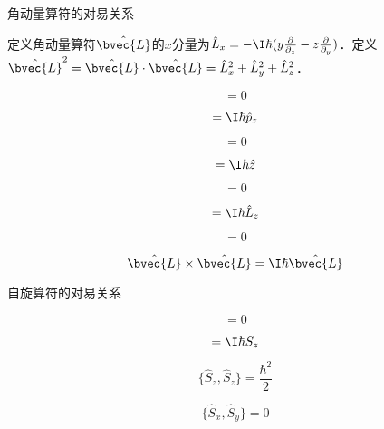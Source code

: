 \begin{theorem}{角动量算符的对易关系}\label{QMPrcp_the6}

定义角动量算符$\hat{\bvec{L}}$的$x$分量为$\hat{L}_x=-\I\hbar(y\frac{\partial}{\partial_z}-z\frac{\partial}{\partial _y})$．定义$\hat{\bvec{L}}^2=\hat{\bvec{L}}\cdot \hat{\bvec{L}}=\hat{L}_x^2+\hat{L}_y^2+\hat{L}_z^2$．

\begin{equation}
[\hat{p}_x, \hat{L}_x]=0
\end{equation}

\begin{equation}
[\hat{p}_x, \hat{L}_y]=\I\hbar\hat{p}_z
\end{equation}

\begin{equation}
[\hat{x}, \hat{L}_x]=0
\end{equation}

\begin{equation}
[\hat{x}, \hat{L}_y]=\I\hbar\hat{z}
\end{equation}

\begin{equation}
[\hat{L}_x, \hat{L}_x]=0
\end{equation}

\begin{equation}
[\hat{L}_x, \hat{L}_y]=\I\hbar\hat{L}_z
\end{equation}

\begin{equation}
[\hat{\bvec{L}}^2, \hat{L}_x]=0
\end{equation}

\begin{equation}
\hat{\bvec{L}}\times\hat{\bvec{L}}=\I\hbar \hat{\bvec{L}}
\end{equation}

\end{theorem}





\begin{theorem}{自旋算符的对易关系}\label{QMPrcp_the8}

\begin{equation}
[\hat{S}_z, \hat{S}_z]=0
\end{equation}

\begin{equation}
[\hat{S}_x, \hat{S}_y]=\I\hbar S_z
\end{equation}

\begin{equation}
\{\hat{S}_z, \hat{S}_z\}=\frac{\hbar^2}{2}
\end{equation}

\begin{equation}
\{\hat{S}_x, \hat{S}_y\}=0
\end{equation}

\end{theorem}






